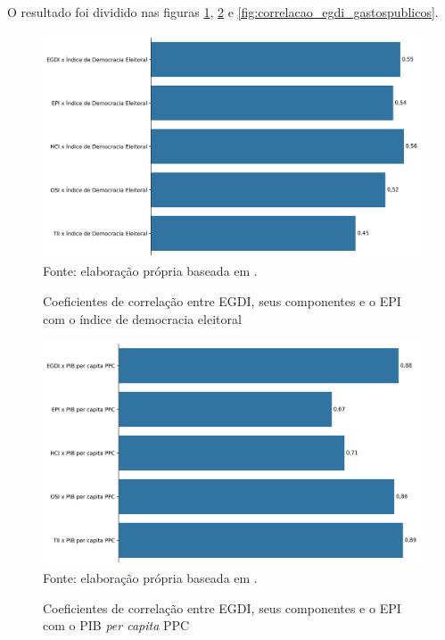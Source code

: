 O resultado foi dividido nas figuras \ref{fig:correlacao_egdi_indicedemocraciaeleitoral}, \ref{fig:correlacao_egdi_pibpercapitapcc} e \ref{fig:correlacao_egdi_gastospublicos}.

\begin{figure}[H]
	\centering
	\caption{Coeficientes de correlação entre EGDI, seus componentes e o EPI com o índice de democracia eleitoral}
	\includegraphics[width=1\linewidth]{figuras/correlacao_egdi_indicedemocraciaeleitoral.png}
	\label{fig:correlacao_egdi_indicedemocraciaeleitoral}
	\footnotesize{Fonte: elaboração própria baseada em \cite{electoral-democracy-index}.}
\end{figure}

\begin{figure}[H]
	\centering
	\caption{Coeficientes de correlação entre EGDI, seus componentes e o EPI com o PIB \textit{per capita} PPC}
	\includegraphics[width=1\linewidth]{figuras/correlacao_egdi_pibpercapitapcc.png}
	\label{fig:correlacao_egdi_pibpercapitapcc}
	\footnotesize{Fonte: elaboração própria baseada em \cite{WB_pib_per_capita_países}.}
\end{figure}

